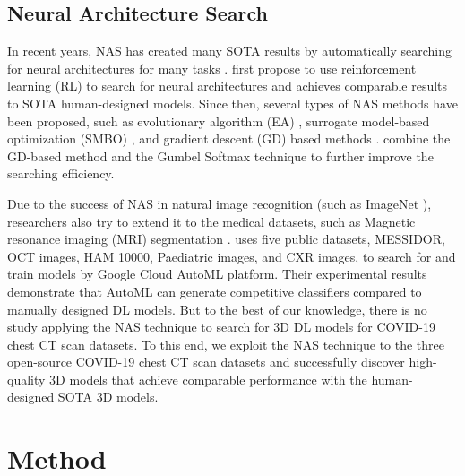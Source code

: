 \documentclass[letterpaper]{article}
\begin{document}
\subsection{Neural Architecture Search}
In recent years, NAS has created many SOTA results by automatically searching for neural architectures for many tasks \cite{automl_survey,nas_survey}. \cite{nas2016,nasnet_zoph17} first propose to use reinforcement learning (RL) to search for neural architectures and achieves comparable results to SOTA human-designed models. Since then, several types of NAS methods have been proposed, such as evolutionary 
algorithm (EA) \cite{amoebanet}, surrogate model-based optimization (SMBO) \cite{pnas_liu18}, and gradient descent (GD) based methods \cite{darts,gdas}. \cite{gdas,fbnet} combine the GD-based method and the Gumbel Softmax \cite{Gumbel_Softmax} technique to further improve the searching efficiency.

Due to the success of NAS in natural image recognition (such as ImageNet \cite{deng2009imagenet}), researchers also try to extend it to the medical datasets, such as Magnetic resonance imaging (MRI) segmentation \cite{scalableNAS}. \cite{Faes2019} uses five public datasets, MESSIDOR, OCT images, HAM 10000, Paediatric images, and CXR images, to search for and train models by Google Cloud AutoML platform. Their experimental results demonstrate that AutoML can generate competitive classifiers compared to manually designed DL models. But to the best of our knowledge, there is no study applying the NAS technique to search for 3D DL models for COVID-19 chest CT scan datasets. To this end, we exploit the NAS technique to the three open-source COVID-19 chest CT scan datasets and successfully discover high-quality 3D models that achieve comparable performance with the human-designed SOTA 3D models.








\section{Method}
\label{section:method}
\end{document}
